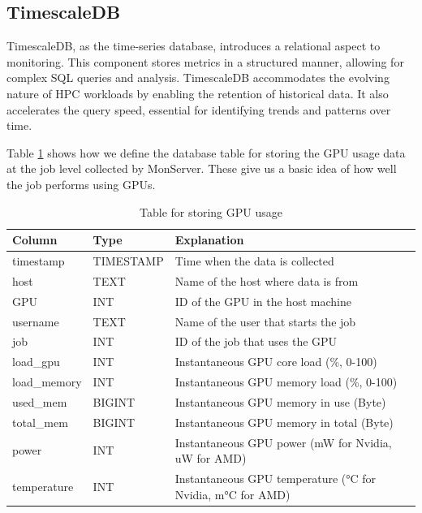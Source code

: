 \subsection{TimescaleDB}
TimescaleDB, as the time-series database, introduces a relational aspect to monitoring. This component stores metrics in a structured manner, allowing for complex SQL queries and analysis. TimescaleDB accommodates the evolving nature of HPC workloads by enabling the retention of historical data. It also accelerates the query speed, essential for identifying trends and patterns over time.

Table \ref{tab:gpu_usage} shows how we define the database table for storing the GPU usage data at the job level collected by MonServer. These give us a basic idea of how well the job performs using GPUs.

\begin{table}[H]
    \centering
    \begin{tabular}{|l|l|l|}
        \hline
        Column & Type & Explanation \\
        \hline
        timestamp & TIMESTAMP & Time when the data is collected \\
        host & TEXT & Name of the host where data is from \\
        GPU & INT & ID of the GPU in the host machine \\
        username & TEXT & Name of the user that starts the job \\
        job & INT & ID of the job that uses the GPU \\
        load\_gpu & INT & Instantaneous GPU core load (\%, 0-100) \\
        load\_memory & INT & Instantaneous GPU memory load (\%, 0-100) \\
        used\_mem & BIGINT & Instantaneous GPU memory in use (Byte) \\
        total\_mem & BIGINT & Instantaneous GPU memory in total (Byte) \\
        power & INT & Instantaneous GPU power (mW for Nvidia, uW for AMD) \\
        temperature & INT & Instantaneous GPU temperature (°C for Nvidia, m°C for AMD) \\
        \hline
    \end{tabular}
    \caption{Table for storing GPU usage}
    \label{tab:gpu_usage}
\end{table}

